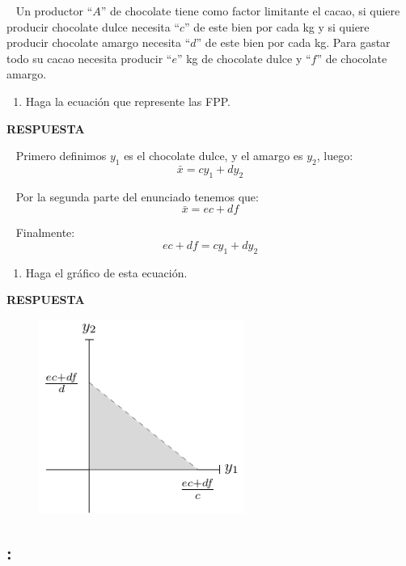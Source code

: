 \documentclass[
  letterpaper,
  DIV=11,
  numbers=noendperiod]{scrreport}
\providecommand{\tightlist}{%
  \setlength{\itemsep}{0pt}\setlength{\parskip}{0pt}}\usepackage{longtable,booktabs,array}
\begin{document}
~ Un productor ``\(A\)'' de chocolate tiene como factor limitante el
cacao, si quiere producir chocolate dulce necesita ``\(c\)'' de este
bien por cada kg y si quiere producir chocolate amargo necesita
``\(d\)'' de este bien por cada kg. Para gastar todo su cacao necesita
producir ``\(e\)'' kg de chocolate dulce y ``\(f\)'' de chocolate
amargo.

\begin{enumerate}
\def\labelenumi{\arabic{enumi})}
\tightlist
\item
  Haga la ecuación que represente las FPP.
\end{enumerate}

\textbf{RESPUESTA}

~ Primero definimos \(y_1\) es el chocolate dulce, y el amargo es
\(y_2\), luego: \[
\bar{x}=cy_1+dy_2
\]

~ Por la segunda parte del enunciado tenemos que: \[
\bar{x}=ec+df
\]

~ Finalmente: \[
ec+df=cy_1+dy_2
\]

\begin{enumerate}
\def\labelenumi{\arabic{enumi})}
\setcounter{enumi}{1}
\tightlist
\item
  Haga el gráfico de esta ecuación.
\end{enumerate}

\textbf{RESPUESTA}

\begin{figure}

{\centering \includegraphics[width=0.6\textwidth,height=\textheight]{7,8titulo_files/figure-pdf/unnamed-chunk-1-1.pdf}

}

\end{figure}

\hypertarget{section-1}{%
\subsection{:}\label{section-1}}
\end{document}

